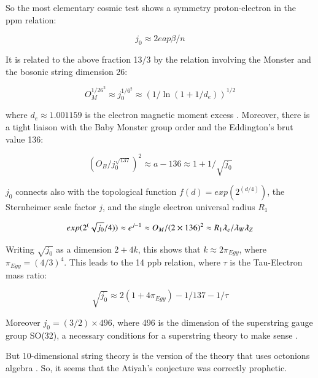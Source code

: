 \documentclass[a4paper,9pt]{article}
\begin{document}
So the most elementary cosmic test shows a symmetry proton-electron in the ppm relation:

\begin{equation}
j_0 \approx 2eap\beta/n 
\end{equation}


It is related to the above fraction 13/3 by the relation involving the Monster and the bosonic string dimension 26:

\begin{equation}
  O_M^{1/26^2} \approx j_0^{1/6^2}\approx (1/\ln(1+1/d_e))^{1/2}   
\end{equation}

where $d_e \approx 1.001159$ is the electron magnetic moment excess \cite{Tanabashi}.
 Moreover, there is a tight liaison with the Baby Monster group order and the Eddington's brut value 136:
 
 \begin{equation}
 ( O_B/ j_0^{\sqrt{137}})^2 \approx a -136 \approx 1 + 1/\sqrt{j_0}
\end{equation}

$j_0$ connects also with the topological function $f(d ) = exp(2^(d/4))$, the Sternheimer scale factor $j$, and the single electron universal radius $R_1$ \cite{Sanchez}
 
 \begin{equation}
 exp(2^(\sqrt{j_0}/4)) \approx e^{j -1} \approx O_M/(2\times 136)^2 \approx R_1 \lambdabar_e / \lambdabar_W \lambdabar_Z
\end{equation}

Writing $\sqrt{j_0}$ as a dimension $2+4k$, this shows that $k \approx 2 \pi_{Egy}$, where $\pi_{Egy} = (4/3)^4$. This leads to the 14 ppb relation, where $\tau$ is the Tau-Electron mass ratio: 

\begin{equation}
 \sqrt{j_0} \approx 2 (1+4\pi_{Egy}) - 1/137 -1/\tau
\end{equation}
 

Moreover $j_0 = (3/2) \times 496$, where 496 is the dimension of the superstring gauge group SO(32), a necessary conditions for a superstring theory to make sense \cite{Green}.


But 10-dimensional string theory is the version of the theory that uses octonions algebra \cite{Schlay}. So, it seems that the Atiyah's conjecture was correctly prophetic.
\end{document}
